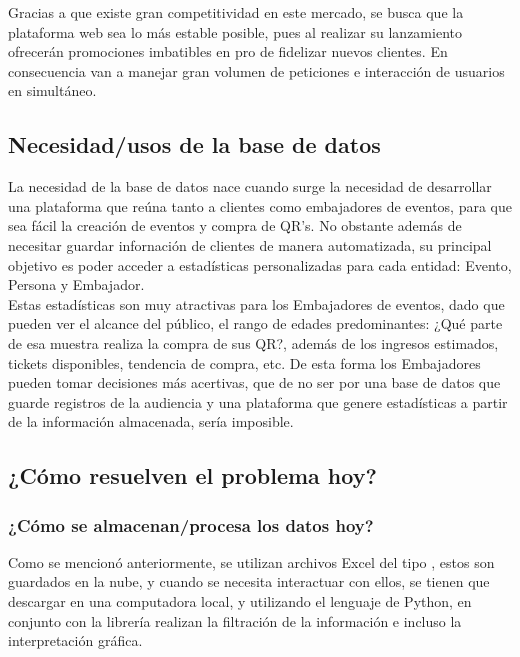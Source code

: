 Gracias a que existe gran competitividad en este mercado, se busca que la plataforma web sea lo más estable posible, pues al realizar su lanzamiento ofrecerán promociones imbatibles en pro de fidelizar nuevos clientes. En consecuencia van a manejar gran volumen de peticiones e interacción de usuarios en simultáneo.\\

\subsection{Necesidad/usos de la base de datos}
La necesidad de la base de datos nace cuando surge la necesidad de desarrollar una plataforma que reúna tanto a clientes como embajadores de eventos, para que sea fácil la creación de eventos y compra de QR's. No obstante además de necesitar guardar infornación de clientes de manera automatizada, su principal objetivo es poder acceder a estadísticas personalizadas para cada entidad: Evento, Persona y Embajador.\\ 

Estas estadísticas son muy atractivas para los Embajadores de eventos, dado que pueden ver el alcance del público, el rango de edades predominantes: ¿Qué parte de esa muestra realiza la compra de sus QR?, además de los ingresos estimados, tickets disponibles, tendencia de compra, etc. De esta forma los Embajadores pueden tomar decisiones más acertivas, que de no ser por una base de datos que guarde registros de la audiencia y una plataforma que genere estadísticas a partir de la información almacenada, sería imposible.\\

\subsection{¿Cómo resuelven el problema hoy?}
\subsubsection{¿Cómo se almacenan/procesa los datos hoy?}
Como se mencionó anteriormente, se utilizan archivos Excel del tipo , estos son guardados en la nube, y cuando se necesita interactuar con ellos, se tienen que descargar en una computadora local, y utilizando el lenguaje de Python, en conjunto con la librería  realizan la filtración de la información e incluso la interpretación gráfica.\\

